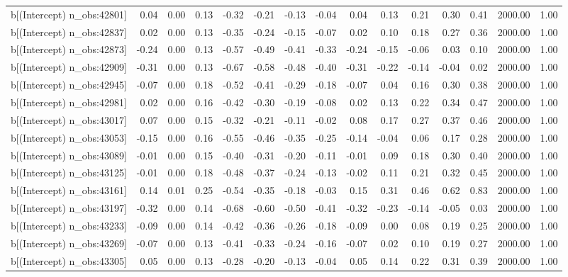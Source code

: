 \begin{table}[ht]
\begin{tabular}{rrrrrrrrrrrrrrr}
  b[(Intercept) n\_obs:42801] & 0.04 & 0.00 & 0.13 & -0.32 & -0.21 & -0.13 & -0.04 & 0.04 & 0.13 & 0.21 & 0.30 & 0.41 & 2000.00 & 1.00 \\ 
  b[(Intercept) n\_obs:42837] & 0.02 & 0.00 & 0.13 & -0.35 & -0.24 & -0.15 & -0.07 & 0.02 & 0.10 & 0.18 & 0.27 & 0.36 & 2000.00 & 1.00 \\ 
  b[(Intercept) n\_obs:42873] & -0.24 & 0.00 & 0.13 & -0.57 & -0.49 & -0.41 & -0.33 & -0.24 & -0.15 & -0.06 & 0.03 & 0.10 & 2000.00 & 1.00 \\ 
  b[(Intercept) n\_obs:42909] & -0.31 & 0.00 & 0.13 & -0.67 & -0.58 & -0.48 & -0.40 & -0.31 & -0.22 & -0.14 & -0.04 & 0.02 & 2000.00 & 1.00 \\ 
  b[(Intercept) n\_obs:42945] & -0.07 & 0.00 & 0.18 & -0.52 & -0.41 & -0.29 & -0.18 & -0.07 & 0.04 & 0.16 & 0.30 & 0.38 & 2000.00 & 1.00 \\ 
  b[(Intercept) n\_obs:42981] & 0.02 & 0.00 & 0.16 & -0.42 & -0.30 & -0.19 & -0.08 & 0.02 & 0.13 & 0.22 & 0.34 & 0.47 & 2000.00 & 1.00 \\ 
  b[(Intercept) n\_obs:43017] & 0.07 & 0.00 & 0.15 & -0.32 & -0.21 & -0.11 & -0.02 & 0.08 & 0.17 & 0.27 & 0.37 & 0.46 & 2000.00 & 1.00 \\ 
  b[(Intercept) n\_obs:43053] & -0.15 & 0.00 & 0.16 & -0.55 & -0.46 & -0.35 & -0.25 & -0.14 & -0.04 & 0.06 & 0.17 & 0.28 & 2000.00 & 1.00 \\ 
  b[(Intercept) n\_obs:43089] & -0.01 & 0.00 & 0.15 & -0.40 & -0.31 & -0.20 & -0.11 & -0.01 & 0.09 & 0.18 & 0.30 & 0.40 & 2000.00 & 1.00 \\ 
  b[(Intercept) n\_obs:43125] & -0.01 & 0.00 & 0.18 & -0.48 & -0.37 & -0.24 & -0.13 & -0.02 & 0.11 & 0.21 & 0.32 & 0.45 & 2000.00 & 1.00 \\ 
  b[(Intercept) n\_obs:43161] & 0.14 & 0.01 & 0.25 & -0.54 & -0.35 & -0.18 & -0.03 & 0.15 & 0.31 & 0.46 & 0.62 & 0.83 & 2000.00 & 1.00 \\ 
  b[(Intercept) n\_obs:43197] & -0.32 & 0.00 & 0.14 & -0.68 & -0.60 & -0.50 & -0.41 & -0.32 & -0.23 & -0.14 & -0.05 & 0.03 & 2000.00 & 1.00 \\ 
  b[(Intercept) n\_obs:43233] & -0.09 & 0.00 & 0.14 & -0.42 & -0.36 & -0.26 & -0.18 & -0.09 & 0.00 & 0.08 & 0.19 & 0.25 & 2000.00 & 1.00 \\ 
  b[(Intercept) n\_obs:43269] & -0.07 & 0.00 & 0.13 & -0.41 & -0.33 & -0.24 & -0.16 & -0.07 & 0.02 & 0.10 & 0.19 & 0.27 & 2000.00 & 1.00 \\ 
  b[(Intercept) n\_obs:43305] & 0.05 & 0.00 & 0.13 & -0.28 & -0.20 & -0.13 & -0.04 & 0.05 & 0.14 & 0.22 & 0.31 & 0.39 & 2000.00 & 1.00 \\ 

\end{tabular}
\end{table}
